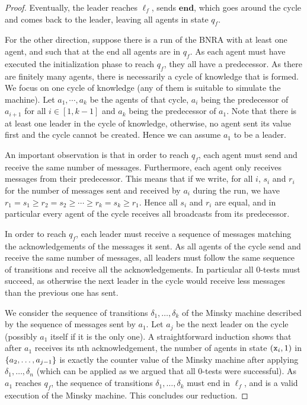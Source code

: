 \begin{proof}
Eventually, the leader reaches $\ell_f$, sends $\mathbf{end}$, which goes around the cycle and comes back to the leader, leaving all agents in state $q_f$.

For the other direction, suppose there is a run of the BNRA with at least one agent, and such that at the end all agents are in $q_f$.
As each agent must have executed the initialization phase to reach $q_f$, they all have a predecessor. As there are finitely many agents, there is necessarily a cycle of knowledge that is formed. We focus on one cycle of knowledge (any of them is suitable to simulate the machine). Let $a_1, \cdots, a_k$ be the agents of that cycle, $a_i$ being the predecessor of $a_{i+1}$ for all $i \in [1,k-1]$ and $a_k$ being the predecessor of $a_1$. Note that there is at least one leader in the cycle of knowledge, otherwise, no agent sent its value first and the cycle cannot be created. Hence we can assume $a_1$ to be a leader.

An important observation is that in order to reach $q_f$, each agent must send and receive the same number of messages. Furthermore, each agent only receives messages from their predecessor. This means that if we write, for all $i$, $s_i$ and $r_i$ for the number of messages sent and received by $a_i$ during the run, we have $r_1 = s_1 \geq r_2 = s_2 \geq \cdots \geq r_k = s_k \geq r_1$. Hence all $s_i$ and $r_i$ are equal, and in particular every agent of the cycle receives all broadcasts from its predecessor.

In order to reach $q_f$, each leader must receive a sequence of messages matching the acknowledgements of the messages it sent. As all agents of the cycle send and receive the same number of messages, all leaders must follow the same sequence of transitions and receive all the acknowledgements. In particular all 0-tests must succeed, as otherwise the next leader in the cycle would receive less messages than the previous one has sent.

We consider the sequence of transitions $\delta_1, \ldots, \delta_k$ of the Minsky machine described by the sequence of messages sent by $a_1$. Let $a_j$ be the next leader on the cycle (possibly $a_1$ itself if it is the only one). A straightforward induction shows that after $a_1$ receives its nth acknowledgement, the number of agents in state $(\mathtt{x}_i, 1)$ in $\{a_2, \ldots, a_{j-1}\}$ is exactly the counter value  of the Minsky machine after applying $\delta_1, \ldots, \delta_n$ (which can be applied as we argued that all 0-tests were successful).
As $a_1$ reaches $q_f$, the sequence of transitions $\delta_1, \ldots, \delta_k$ must end in $\ell_f$, and is a valid execution of the Minsky machine. This concludes our reduction.
\end{proof}